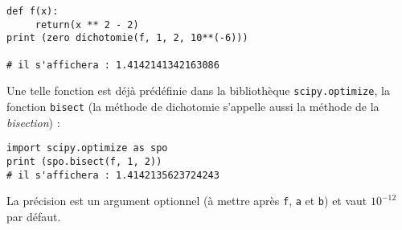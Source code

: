 \begin{lstlisting}
def f(x):
     return(x ** 2 - 2)
print (zero dichotomie(f, 1, 2, 10**(-6)))

# il s'affichera : 1.4142141342163086
\end{lstlisting}
%
% 

Une telle fonction est déjà prédéfinie dans la bibliothèque \lstinline{scipy.optimize}, la fonction \lstinline{bisect} \linebreak (la méthode de dichotomie s'appelle aussi la méthode de la \textit{bisection}) : 
\begin{lstlisting}
import scipy.optimize as spo
print (spo.bisect(f, 1, 2)) 
# il s'affichera : 1.4142135623724243
\end{lstlisting}
La précision est un argument optionnel (à mettre après \lstinline{f}, \lstinline{a} et \lstinline{b}) et vaut $10^{-12}$ par défaut.

